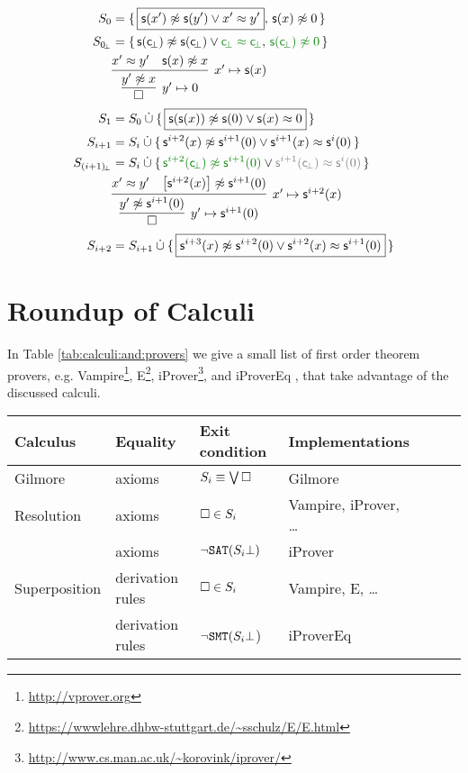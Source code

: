 \begin{align*}
S_0 &= \{ \, \boxed{\msucc(x') \mNE \msucc (y') \lor x' \mEQ y'}, \, \msucc(x)\mNE 0 \, \}
\\
S_{0\!_\bot} &= \{ \, \msucc(\consbot) \mNE \msucc (\consbot) \lor{\colHi\consbot \mEQ \consbot}, \, {\colHi \msucc(\consbot)\mNE 0} \, \}
\\
&\infer[x'\mapsto \msucc(x)
]{
	\infer[y'\mapsto 0]{\emptyclause}{ y'\mNE x }
}
{x' \mEQ y' & \msucc(x)\mNE x}
\\
S_1 &= S_0\disjointunion \{ \,
\boxed{\msucc(\msucc(x)) \mNE \msucc(0) \lor \msucc(x) \mEQ 0} \,
\}
\\
S_{i+1} &= S_i\disjointunion \{ \,
\msucc^{i+2}(x) \mNE \msucc^{i+1} (0) \lor \msucc^{i+1}(x) \mEQ \msucc^i(0) \,
\}
\\
S_{(i+1)\!_\bot} &= S_i\disjointunion \{ \,
{\colHi \msucc^{i+2}(\consbot) \mNE \msucc^{i+1} (0)} \lor {\colG\msucc^{i+1}(\consbot) \mEQ \msucc^i(0)} \,
\}
\\
&\infer[x'\mapsto \msucc^{i+2}(x)
]{
	\infer[y'\mapsto \msucc^{i+1}(0)]{\emptyclause}{ y'\mNE \msucc^{i+1}(0) }
}
{x' \mEQ y' & \left[\msucc^{i+2}(x)\right]\mNE \msucc^{i+1}(0)}
\\
S_{i+2} &= S_{i+1}\disjointunion \{ \,
\boxed{\msucc^{i+3}(x) \mNE \msucc^{i+2}(0) \lor \msucc^{i+2}(x) \mEQ \msucc^{i+1}(0)} \,
\}
\end{align*}

\newpage
\section{Roundup of Calculi}

In Table \vref{tab:calculi:and:provers} we give a small list of first order theorem provers,
e.g. 
Vampire\footnote{\url{http://vprover.org}}, 
E\footnote{\url{https://wwwlehre.dhbw-stuttgart.de/~sschulz/E/E.html}},
iProver\footnote{\url{http://www.cs.man.ac.uk/~korovink/iprover/}},
and iProverEq \cite{KS2010ijcar},
that take advantage of the discussed calculi.

\begin{table}[hb]
\begin{tabular}{lllllll}
	\toprule
	Calculus & Equality & Exit condition & Implementations
	\\ \midrule
	Gilmore & axioms & \( S_i \equiv \bigvee\square \) & Gilmore
	\\
	Resolution & axioms & \( \square\in S_i \) & Vampire, iProver, \ldots
	\\
	\InstGen{} & axioms & \( \lnot\texttt{SAT}(S_i\bot) \) 
	& iProver
	\\
	Superposition & derivation rules & \( \square\in S_i \) 
	& Vampire, E, \ldots
	\\
	\InstGenEQ{} & derivation rules & \( \lnot\texttt{SMT}(S_i\bot \)) 
	& iProverEq
	\\ \bottomrule
\end{tabular}
\label{tab:calculi:and:provers}
\end{table}





